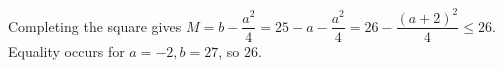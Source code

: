 Completing the square gives $M=b-\dfrac{a^2}{4}=25-a-\dfrac{a^2}{4}=26-\dfrac{(a+2)^2}{4}\le26$. Equality occurs for $a=-2,b=27$, so $\boxed{26}$.
